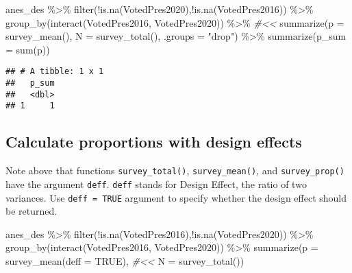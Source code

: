 \documentclass[
]{krantz}
\makeatletter
\newenvironment{Shaded}{\begin{snugshade}}{\end{snugshade}}
\newcommand{\AttributeTok}[1]{\textcolor[rgb]{0.61,0.61,0.61}{#1}}
\newcommand{\CommentTok}[1]{\textcolor[rgb]{0.37,0.37,0.37}{\textit{#1}}}
\newcommand{\ConstantTok}[1]{\textcolor[rgb]{0,0,0}{#1}}
\newcommand{\FunctionTok}[1]{\textcolor[rgb]{0,0,0}{#1}}
\newcommand{\NormalTok}[1]{#1}
\newcommand{\SpecialCharTok}[1]{\textcolor[rgb]{0,0,0}{#1}}
\newcommand{\StringTok}[1]{\textcolor[rgb]{0.5,0.5,0.5}{#1}}
\newenvironment{kframe}{%
\medskip{}
\setlength{\fboxsep}{.8em}
 \def\at@end@of@kframe{}%
 \ifinner\ifhmode%
  \def\at@end@of@kframe{\end{minipage}}%
  \begin{minipage}{\columnwidth}%
 \fi\fi%
 \def\FrameCommand##1{\hskip\@totalleftmargin \hskip-\fboxsep
 \colorbox{shadecolor}{##1}\hskip-\fboxsep
     \hskip-\linewidth \hskip-\@totalleftmargin \hskip\columnwidth}%
 \MakeFramed {\advance\hsize-\width
   \@totalleftmargin\z@ \linewidth\hsize
   \@setminipage}}%
 {\par\unskip\endMakeFramed%
 \at@end@of@kframe}
\renewenvironment{Shaded}{\begin{kframe}}{\end{kframe}}
\makeatother
\begin{document}
\begin{Shaded}
\begin{Highlighting}[]
\NormalTok{anes\_des }\SpecialCharTok{\%\textgreater{}\%}
  \FunctionTok{filter}\NormalTok{(}\SpecialCharTok{!}\FunctionTok{is.na}\NormalTok{(VotedPres2020),}\SpecialCharTok{!}\FunctionTok{is.na}\NormalTok{(VotedPres2016)) }\SpecialCharTok{\%\textgreater{}\%}
  \FunctionTok{group\_by}\NormalTok{(}\FunctionTok{interact}\NormalTok{(VotedPres2016, VotedPres2020)) }\SpecialCharTok{\%\textgreater{}\%} \CommentTok{\#\textless{}\textless{}}
  \FunctionTok{summarize}\NormalTok{(}\AttributeTok{p =} \FunctionTok{survey\_mean}\NormalTok{(),}
            \AttributeTok{N =} \FunctionTok{survey\_total}\NormalTok{(),}
            \AttributeTok{.groups =} \StringTok{"drop"}\NormalTok{) }\SpecialCharTok{\%\textgreater{}\%} 
  \FunctionTok{summarize}\NormalTok{(}\AttributeTok{p\_sum =} \FunctionTok{sum}\NormalTok{(p))}
\end{Highlighting}
\end{Shaded}

\begin{verbatim}
## # A tibble: 1 x 1
##   p_sum
##   <dbl>
## 1     1
\end{verbatim}

\hypertarget{calculate-proportions-with-design-effects}{%
\subsection{Calculate proportions with design effects}\label{calculate-proportions-with-design-effects}}

Note above that functions \texttt{survey\_total()}, \texttt{survey\_mean()}, and \texttt{survey\_prop()} have the argument \texttt{deff}. \texttt{deff} stands for Design Effect, the ratio of two variances. Use \texttt{deff\ =\ TRUE} argument to specify whether the design effect should be returned.

\begin{Shaded}
\begin{Highlighting}[]
\NormalTok{anes\_des }\SpecialCharTok{\%\textgreater{}\%}
  \FunctionTok{filter}\NormalTok{(}\SpecialCharTok{!}\FunctionTok{is.na}\NormalTok{(VotedPres2016),}\SpecialCharTok{!}\FunctionTok{is.na}\NormalTok{(VotedPres2020)) }\SpecialCharTok{\%\textgreater{}\%}
  \FunctionTok{group\_by}\NormalTok{(}\FunctionTok{interact}\NormalTok{(VotedPres2016, VotedPres2020)) }\SpecialCharTok{\%\textgreater{}\%}
  \FunctionTok{summarize}\NormalTok{(}\AttributeTok{p =} \FunctionTok{survey\_mean}\NormalTok{(}\AttributeTok{deff =} \ConstantTok{TRUE}\NormalTok{), }\CommentTok{\#\textless{}\textless{}}
            \AttributeTok{N =} \FunctionTok{survey\_total}\NormalTok{())}
\end{Highlighting}
\end{Shaded}
\end{document}
